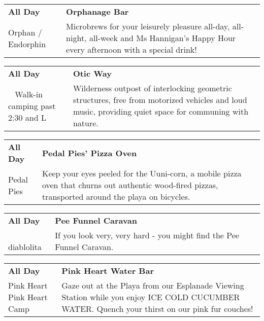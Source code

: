 \begin{tabular}{ p{1in} p{2.2in} }
    \textbf{All Day} & \textbf{Orphanage Bar} \\
    Orphan / Endorphin \newline  & Microbrews for your leisurely pleasure all-day, all-night, all-week and Ms Hannigan's Happy Hour every afternoon with a special drink! \\
    \hline 
\end{tabular}
    
\begin{tabular}{ p{1in} p{2.2in} }
    \textbf{All Day} & \textbf{Otic Way} \\
    ~ \newline Walk-in camping past 2:30 and L & Wilderness outpost of interlocking geometric structures, free from motorized vehicles and loud music, providing quiet space for communing with nature. \\
    \hline 
\end{tabular}
    
\begin{tabular}{ p{1in} p{2.2in} }
    \textbf{All Day} & \textbf{Pedal Pies' Pizza Oven} \\
    Pedal Pies \newline  & Keep your eyes peeled for the Uuni-corn, a mobile pizza oven that churns out authentic wood-fired pizzas, transported around the playa on bicycles. \\
    \hline 
\end{tabular}
    
\begin{tabular}{ p{1in} p{2.2in} }
    \textbf{All Day} & \textbf{Pee Funnel Caravan} \\
    ~ \newline diablolita & If you look very, very hard - you might find the Pee Funnel Caravan. \\
    \hline 
\end{tabular}
    
\begin{tabular}{ p{1in} p{2.2in} }
    \textbf{All Day} & \textbf{Pink Heart Water Bar} \\
    Pink Heart \newline Pink Heart Camp & Gaze out at the Playa from our Esplanade Viewing Station while you enjoy ICE COLD CUCUMBER WATER. Quench your thirst on our pink fur couches! \\
    \hline 
\end{tabular}
    
